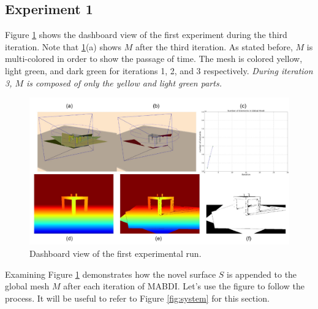 \subsection{Experiment 1}

Figure \ref{fig:run1} shows the dashboard view of the first experiment during
the third iteration. Note that \ref{fig:run1}(a) shows $M$ after the third
iteration. As stated before, $M$ is multi-colored in order to show the passage
of time. The mesh is colored yellow, light green, and dark green for iterations
1, 2, and 3 respectively. \emph{During iteration 3, $M$ is composed of only the
yellow and light green parts.}

\begin{figure}[h]%
\centering
  \includegraphics[width=\textwidth]{figures/diagram_run1.pdf}
  \caption{Dashboard view of the first experimental run.}
  \label{fig:run1}
\end{figure}

Examining Figure \ref{fig:run1} demonstrates how the novel surface
$S$ is appended to the global mesh $M$ after each iteration of MABDI. Let's use
the figure to follow the process. It will be useful to refer to Figure
\ref{fig:system} for this section.

